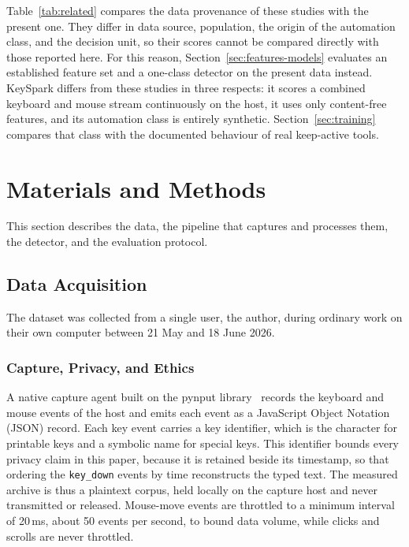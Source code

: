 \documentclass[sensors,article,submit,pdftex,oneauthor]{Definitions/mdpi}
\begin{document}
Table~\ref{tab:related} compares the data provenance of these studies with the present one. They differ in data source, population, the origin of the automation class, and the decision unit, so their scores cannot be compared directly with those reported here. For this reason, Section~\ref{sec:features-models} evaluates an established feature set and a one-class detector on the present data instead. KeySpark differs from these studies in three respects: it scores a combined keyboard and mouse stream continuously on the host, it uses only content-free features, and its automation class is entirely synthetic. Section~\ref{sec:training} compares that class with the documented behaviour of real keep-active tools.



\section{Materials and Methods}
\label{sec:methods}

This section describes the data, the pipeline that captures and processes them, the detector, and the evaluation protocol.

\subsection{Data Acquisition}
\label{sec:dataset}

The dataset was collected from a single user, the author, during ordinary work on their own computer between 21 May and 18 June 2026.

\subsubsection{Capture, Privacy, and Ethics}
\label{sec:capture}
A native capture agent built on the pynput library~\cite{pynput} records the keyboard and mouse events of the host and emits each event as a JavaScript Object Notation (JSON) record. Each key event carries a key identifier, which is the character for printable keys and a symbolic name for special keys. This identifier bounds every privacy claim in this paper, because it is retained beside its timestamp, so that ordering the \texttt{key\_down} events by time reconstructs the typed text. The measured archive is thus a plaintext corpus, held locally on the capture host and never transmitted or released. Mouse-move events are throttled to a minimum interval of 20\,ms, about 50 events per second, to bound data volume, while clicks and scrolls are never throttled.
\end{document}
